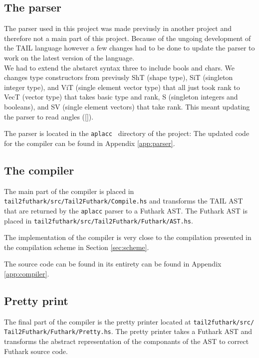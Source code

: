 \documentclass[11pt]{article}
\begin{document}
\subsection{The parser}
The parser used in this project was made previusly in another project \cite{APLACC} and therefore not a main part of this project. Because of the ungoing development of the TAIL language however a few changes had to be done to update the parser to work on the latest version of the language. \\

We had to extend the abstarct syntax three to include bools and chars. 
We changes type constructors from previusly ShT (shape type), SiT (singleton integer type), and ViT (single element vector type) that all just took rank
to VecT (vector type) that takes basic type and rank, S (singleton integers and booleans), and SV (single element vectors) that take rank. 
This meant updating the parser to read angles ([]).

The parser is located in the {\tt aplacc } directory of the project: 
The updated code for the compiler can be found in Appendix \ref{app:parser}.

\subsection{The compiler}
The main part of the compiler is placed in {\tt tail2futhark/src/Tail2Futhark/Compile.hs} and transforms the TAIL AST that are returned by the {\tt aplacc} parser to a Futhark AST. The Futhark AST is placed in {\tt tail2futhark/src/Tail2Futhark/Futhark/AST.hs}.

The implementation of the compiler is very close to the compilation presented in the compilation scheme in Section  \ref{sec:scheme}. 

% 

The source code can be found in its entirety can be found in Appendix \ref{app:compiler}.

\subsection{Pretty print}
The final part of the compiler is the pretty printer located at {\tt tail2futhark/src/
Tail2Futhark/Futhark/Pretty.hs}. 
The pretty printer takes a Futhark AST and transforms the abstract representation of the componants of the AST to correct Futhark source code. 
\end{document}
